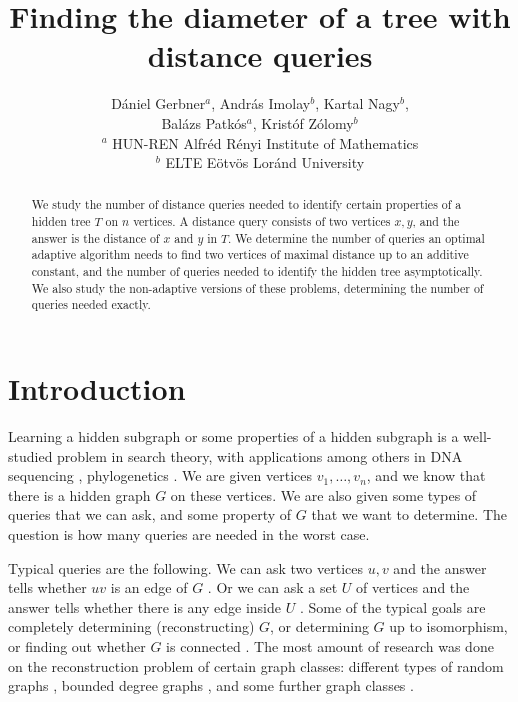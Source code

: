 \documentclass[12pt,a4paper]{amsart}
\title{Finding the diameter of a tree with distance queries}
\date{}
\theoremstyle{plain}
\theoremstyle{definition}
\begin{document}
\author[]{D\'aniel Gerbner$^a$, Andr\'as Imolay$^{b}$, Kartal Nagy$^b$,\\ Bal\'azs Patk\'os$^a$, Krist\'of Z\'olomy$^{b}$  
\\
\small $^a$ HUN-REN Alfr\'ed R\'enyi Institute of Mathematics \\
\small $^b$ ELTE E\"otv\"os Lor\'and University 
}
\begin{abstract}
    We study the number of distance queries needed to identify certain properties of a hidden tree $T$ on $n$ vertices. A distance query consists of two vertices $x,y$, and the answer is the distance of $x$ and  $y$ in  $T$. We determine the number of queries an optimal adaptive algorithm needs to find two vertices of maximal distance up to an additive constant, and the number of queries needed to identify the hidden tree asymptotically. 
We also study the non-adaptive versions of these problems, determining the number of queries needed exactly.

\end{abstract}

\maketitle

\section{Introduction}


Learning a hidden subgraph or some properties of a hidden subgraph is a well-studied problem in search theory, with applications among others in DNA sequencing \cite{A+,DFS}, phylogenetics \cite{philo1,philo2}. We are given vertices $v_1,\dots,v_n$, and we know that there is a hidden graph $G$ on these vertices. We are also given some types of queries that we can ask, and some property of $G$ that we want to determine. The question is how many queries are needed in the worst case.

Typical queries are the following. We can ask two vertices $u,v$ and the answer tells whether $uv$ is an edge of $G$ \cite{AN,RS}. Or we can ask a set $U$ of vertices and the answer tells whether there is any edge inside $U$ \cite{AA,AC}. Some of the typical goals are completely determining (reconstructing) $G$, or determining $G$ up to isomorphism, or finding out whether $G$ is connected \cite{ACK}. The most amount of research was done on the reconstruction problem \cite{os} of certain graph classes: different types of random graphs \cite{B,KM}, bounded degree graphs \cite{SW}, and some further graph classes \cite{BG,BG2}.
\end{document}
